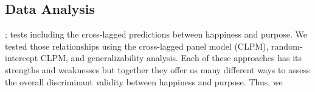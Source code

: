 \documentclass[
  letterpaper,
  DIV=11,
  numbers=noendperiod]{scrartcl}
\newenvironment{Shaded}{\begin{snugshade}}{\end{snugshade}}
\newcommand{\CommentTok}[1]{\textcolor[rgb]{0.37,0.37,0.37}{#1}}
\newcommand{\DecValTok}[1]{\textcolor[rgb]{0.68,0.00,0.00}{#1}}
\newcommand{\DocumentationTok}[1]{\textcolor[rgb]{0.37,0.37,0.37}{\textit{#1}}}
\newcommand{\FunctionTok}[1]{\textcolor[rgb]{0.28,0.35,0.67}{#1}}
\newcommand{\NormalTok}[1]{\textcolor[rgb]{0.00,0.23,0.31}{#1}}
\newcommand{\OtherTok}[1]{\textcolor[rgb]{0.00,0.23,0.31}{#1}}
\newcommand{\SpecialCharTok}[1]{\textcolor[rgb]{0.37,0.37,0.37}{#1}}
\begin{document}
\subsection{Data Analysis}\label{data-analysis}

; tests including the cross-lagged predictions between happiness and
purpose. We tested those relationships using the cross-lagged panel
model (CLPM), random-intercept CLPM, and generalizability analysis. Each
of these approaches has its strengths and weaknesses but together they
offer us many different ways to assess the overall discriminant validity
between happiness and purpose. Thus, we

\begin{Shaded}
\end{Shaded}
\end{document}
